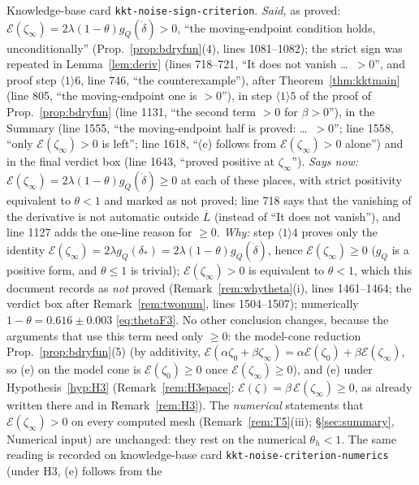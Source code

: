 \documentclass[11pt]{article}
\begin{document}
\begin{enumerate}[label=C\arabic*,ref=C\arabic*,leftmargin=2.4em,itemsep=3pt]
 Knowledge-base card \texttt{kkt-noise-sign-criterion}.
 \emph{Said,} as proved: $\mathcal E(\zeta_\infty)=2\lambda(1-\theta)g_Q(\dot\delta)>0$,
 ``the moving-endpoint condition holds, unconditionally'' (Prop.~\ref{prop:bdryfun}(4),
 lines 1081--1082); the strict sign was repeated in Lemma~\ref{lem:deriv} (lines 718--721,
 ``It does not vanish \dots\ $>0$'', and proof step $\langle1\rangle6$, line 746, ``the
 counterexample''), after Theorem~\ref{thm:kktmain} (line 805, ``the moving-endpoint one is
 $>0$''), in step $\langle1\rangle5$ of the proof of Prop.~\ref{prop:bdryfun} (line 1131,
 ``the second term $>0$ for $\beta>0$''), in the Summary (line 1555, ``the moving-endpoint
 half is proved: \dots\ $>0$''; line 1558, ``only $\mathcal E(\zeta_\infty)>0$ is left'';
 line 1618, ``(e) follows from $\mathcal E(\zeta_\infty)>0$ alone'') and in the final
 verdict box (line 1643, ``proved positive at $\zeta_\infty$'').
 \emph{Says now:} $\mathcal E(\zeta_\infty)=2\lambda(1-\theta)g_Q(\dot\delta)\ge0$ at each
 of these places, with strict positivity equivalent to $\theta<1$ and marked as not proved;
 line 718 says that the vanishing of the derivative is not automatic outside $\overline L$
 (instead of ``It does not vanish''), and line 1127 adds the one-line reason for $\ge0$.
 \emph{Why:} step $\langle1\rangle4$ proves only the identity
 $\mathcal E(\zeta_\infty)=2\lambda g_Q(\delta_*)=2\lambda(1-\theta)g_Q(\dot\delta)$, hence
 $\mathcal E(\zeta_\infty)\ge0$ ($g_Q$ is a positive form, and $\theta\le1$ is trivial);
 $\mathcal E(\zeta_\infty)>0$ is equivalent to $\theta<1$, which this document records as
 \emph{not} proved (Remark~\ref{rem:whytheta}(i), lines 1461--1464; the verdict box after
 Remark~\ref{rem:twonum}, lines 1504--1507); numerically $1-\theta=0.616\pm0.003$
 \eqref{eq:thetaF3}.  No other conclusion changes, because the arguments that use this term
 need only $\ge0$: the model-cone reduction Prop.~\ref{prop:bdryfun}(5) (by additivity,
 $\mathcal E(\alpha\zeta_0+\beta\zeta_\infty)=\alpha\mathcal E(\zeta_0)+\beta\mathcal E(\zeta_\infty)$,
 so (e) on the model cone is $\mathcal E(\zeta_0)\ge0$ once $\mathcal E(\zeta_\infty)\ge0$),
 and (e) under Hypothesis~\ref{hyp:H3} (Remark~\ref{rem:H3space}:
 $\mathcal E(\zeta)=\beta\,\mathcal E(\zeta_\infty)\ge0$, as already written there and in
 Remark~\ref{rem:H3}).  The \emph{numerical} statements that $\mathcal E(\zeta_\infty)>0$ on
 every computed mesh (Remark~\ref{rem:T5}(iii); \S\ref{sec:summary}, Numerical input) are
 unchanged: they rest on the numerical $\theta_h<1$.  The same reading is recorded on
 knowledge-base card \texttt{kkt-noise-criterion-numerics} (under H3, (e) follows from the

\end{enumerate}
\end{document}

